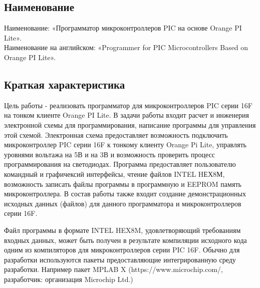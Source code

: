 \subsection{Наименование}
Наименование: «Программатор микроконтроллеров PIC на основе Orange PI Lite». \\
Наименование на английском: «Programmer for PIC Microcontrollers Based on Orange PI Lite». \\


\subsection{Краткая характеристика}
    Цель работы - реализовать программатор для микроконтроллеров PIC серии 16F на тонком клиенте Orange PI Lite.
    В задачи работы входит расчет и инженерия электронной схемы для программирования, написание программы для управления этой схемой.
    Электронная схема предоставляет возможность подключить микроконтроллер PIC серии 16F к тонкому клиенту Orange Pi Lite, управлять уровнями вольтажа на 5В и на 3В и возможность проверить процесс программирования на светодиодах.         
    Программа предоставляет пользователю командный и графичексий интерфейсы, чтение файлов INTEL HЕХ8М, возможность записать файлы программы в программную и EEPROM память микроконтроллера.
    В состав работы также входит создание демонстрационных исходных данных (файлов) для данного программатора и микроконтроллеров серии 16F.

\smallskip
Файл программы в формате INTEL HEX8M, удовлетворяющий требованиям входных данных, может быть получен в результате компиляции исходного кода одним из компиляторов для микроконтроллеров серии PIC 16F. Обычно для разработки используются пакеты предоставляющие интегрированную среду разработки. Например пакет MPLAB X (https://www.microchip.com/, разработчик: организация Microchip Ltd.)
